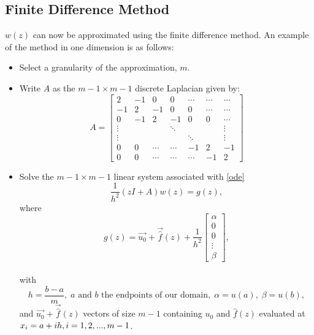 \documentclass[letterpaper, 12pt]{article}
\def\i{\text{i}}
\begin{document}
		\subsection*{Finite Difference Method}
		$w(z)$ can now be approximated using the finite difference method. An example of the method in one dimension is as follows:
		\begin{itemize}
		\renewcommand{\labelitemi}{--}
			\item Select a granularity of the approximation, $m$.
			\item Write $A$ as the $m-1\times m-1$ discrete Laplacian given by:
				$$A=\begin{bmatrix}
				2 & -1 & 0 & 0 & \cdots & \cdots & \cdots\\
				-1 & 2 & -1 & 0 & 0 & \cdots & \cdots \\
				0 & -1 & 2 & -1 & 0 & 0 & \cdots \\
				\vdots & & & \ddots & & & \vdots \\
				\vdots & & & & \ddots & & \vdots \\
				0 & 0 & \cdots & \cdots & -1 & 2 & -1 \\
				0 & 0 & \cdots & \cdots &\cdots & -1 & 2
				\end{bmatrix}$$
			\item Solve the $m-1\times m-1$ linear system associated with \eqref{ode}
				$$\frac{1}{h^2}(zI+A)w(z)=g(z),$$
				where
				$$g(z)=\vec{u_0}+\vec{\hat{f}}(z)+\frac{1}{h^2}
				\begin{bmatrix}
					\alpha \\
					0 \\
					0 \\
					\vdots \\
					\beta
				\end{bmatrix},$$ \\
				with
				$$h=\frac{b-a}{m},\; a\text{ and } b\text{ the endpoints of our domain},\;\alpha=u(a),\;\beta=u(b),$$
				and
				$\vec{u_0}+\vec{\hat{f}}(z)$ vectors of size $m-1$ containing $u_0$ and $\hat{f}(z)$ evaluated at $x_i=a+ih,\\i=1,2,...,m-1$.
		\end{itemize}
		
\end{document}

